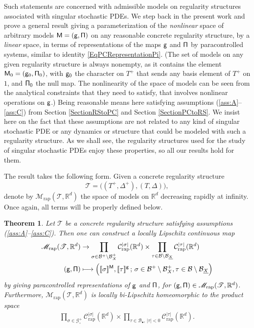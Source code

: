 \documentclass[10pt]{amsart}
\newcommand\mto{\mathchoice{\longmapsto}{\mapsto}{\mapsto}{\mapsto}}
\newcommand{\sbullet}{{\scriptscriptstyle\bullet}}
\theoremstyle{plain}
\newtheorem{thm}{Theorem}
\theoremstyle{definition}
\newcommand{\Brac}[1]{[\![#1]\!]}
\newcommand{\rap}{\mathrm{rap}}
\newcommand{\scrM}{\mathscr{M}}
\newcommand{\scrT}{\mathscr{T}}
\newcommand{\bbR}{\mathbb{R}}
\newcommand{\mcB}{\mathcal{B}}
\newcommand{\mcC}{\mathcal{C}}
\newcommand{\mcG}{\mathcal{G}}
\begin{document}
Such statements are concerned with admissible models on regularity structures associated with singular stochastic PDEs. We step back in the present work and prove a general result giving a parameterization of the \emph{nonlinear} space of arbitrary models $\sf M=(g,\Pi)$ on any reasonable concrete regularity structure, by a \emph{linear} space, in terms of representations of the maps $\sf g$ and $\sf \Pi$ by paracontrolled systems, similar to identity \eqref{EqPCRepresentationPi}. (The set of models on any given regularity structure is always nonempty, as it contains the element ${\sf M}_0 = ({\sf g}_0, {\sf \Pi}_0)$, with ${\sf g}_0$ the character on $T^+$ that sends any basis element of $T^+$ on $1$, and ${\sf \Pi}_0$ the null map. The nonlinearity of the space of models can be seen from the analytical constraints that they need to satisfy, that involves nonlinear operations on $\sf g$.) Being reasonable means here satisfying assumptions \hbox{(\ref{ass:A}--\ref{ass:C})} from Section \ref{SectionRStoPC} and Section \ref{SectionPCtoRS}. We insist here on the fact that these assumptions are not related to any kind of singular stochastic PDE or any dynamics or structure that could be modeled with such a regularity structure. As we shall see, the regularity structures used for the study of singular stochastic PDEs enjoy these properties, so all our results hold for them.

The result takes the following form. Given a concrete regularity structure
\[
\scrT=\bigl((T^+,\Delta^+), (T,\Delta)\bigr),
\]
denote by $\scrM_\rap(\scrT, \bbR^d)$ the space of models on $\bbR^d$ decreasing rapidly at infinity. Once again, all terms will be properly defined below.

\begin{thm}\label{mainthm1}
Let $\scrT$ be a concrete regularity structure satisfying assumptions \textup{(\ref{ass:A}--\ref{ass:C})}. Then one can construct a locally Lipschitz continuous map
\begin{equation} \begin{split} \label{EqMapModelsToRemainders}
\scrM_\rap(\scrT, \bbR^d) &\to
\prod_{\sigma\in\mcB^+\setminus\mcB_X^+} \mcC_\rap^{|\sigma|}(\bbR^d) \times \prod_{\tau\in\mcB\setminus\mcB_{\underline{X}}} \mcC_\rap^{|\tau|}(\bbR^d) \\
{\sf (g,\Pi)} &\mto \Bigl(\Brac{\sigma}^{\sf M}, \Brac{\tau}^{\sf g}\,;\, \sigma\in\mcB^+\setminus\mcB_X^+, \tau\in\mcB\setminus\mcB_{\underline{X}} \Bigr)
\end{split} \end{equation}
by giving paracontrolled representations of $\sf g$ and $\sf \Pi$, for $({\sf g}, {\sf \Pi})\in \scrM_\rap(\scrT, \bbR^d)$. Furthermore, $\scrM_\rap(\scrT, \bbR^d)$ is locally bi-Lipschitz homeomorphic to the product space
\begin{align} \label{EqParametrizationThm1}
\prod_{\sigma\in\mcG_\circ^+} \mcC_\rap^{|\sigma|}(\bbR^d) \times \prod_{\tau\in\mcB_\sbullet,\,|\tau|<0} \mcC_\rap^{|\tau|}(\bbR^d).
\end{align}
\end{thm}
\end{document}
